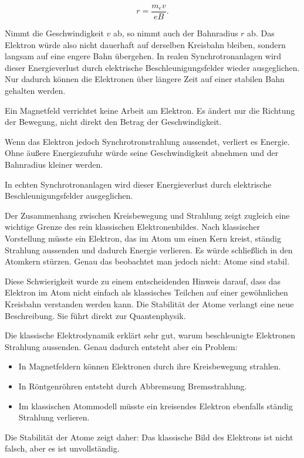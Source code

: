 \[
r = \frac{m_e v}{eB}.
\]

Nimmt die Geschwindigkeit \(v\) ab, so nimmt auch der Bahnradius \(r\) ab.
Das Elektron würde also nicht dauerhaft auf derselben Kreisbahn bleiben,
sondern langsam auf eine engere Bahn übergehen. In realen Synchrotronanlagen
wird dieser Energieverlust durch elektrische Beschleunigungsfelder wieder
ausgeglichen. Nur dadurch können die Elektronen über längere Zeit auf einer
stabilen Bahn gehalten werden.

\begin{DidacticBox}
	\label{box:synchrotronstrahlung-energieverlust}
	Ein Magnetfeld verrichtet keine Arbeit am Elektron. Es ändert nur die Richtung
	der Bewegung, nicht direkt den Betrag der Geschwindigkeit.
	
	Wenn das Elektron jedoch Synchrotronstrahlung aussendet, verliert es Energie.
	Ohne äußere Energiezufuhr würde seine Geschwindigkeit abnehmen und der
	Bahnradius kleiner werden.
	
	In echten Synchrotronanlagen wird dieser Energieverlust durch elektrische
	Beschleunigungsfelder ausgeglichen.
\end{DidacticBox}

Der Zusammenhang zwischen Kreisbewegung und Strahlung zeigt zugleich eine
wichtige Grenze des rein klassischen Elektronenbildes. Nach klassischer
Vorstellung müsste ein Elektron, das im Atom um einen Kern kreist, ständig
Strahlung aussenden und dadurch Energie verlieren. Es würde schließlich in den
Atomkern stürzen. Genau das beobachtet man jedoch nicht: Atome sind stabil.

Diese Schwierigkeit wurde zu einem entscheidenden Hinweis darauf, dass das
Elektron im Atom nicht einfach als klassisches Teilchen auf einer gewöhnlichen
Kreisbahn verstanden werden kann. Die Stabilität der Atome verlangt eine neue
Beschreibung. Sie führt direkt zur Quantenphysik.

\begin{DidacticBox}
	\label{box:strahlung-und-grenze-klassik}
	Die klassische Elektrodynamik erklärt sehr gut, warum beschleunigte Elektronen
	Strahlung aussenden. Genau dadurch entsteht aber ein Problem:
	
	\begin{itemize}
		\item In Magnetfeldern können Elektronen durch ihre Kreisbewegung strahlen.
		\item In Röntgenröhren entsteht durch Abbremsung Bremsstrahlung.
		\item Im klassischen Atommodell müsste ein kreisendes Elektron ebenfalls
		ständig Strahlung verlieren.
	\end{itemize}
	
	Die Stabilität der Atome zeigt daher: Das klassische Bild des Elektrons ist
	nicht falsch, aber es ist unvollständig.
\end{DidacticBox}

